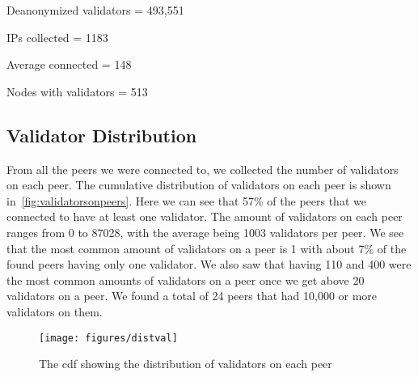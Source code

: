 Deanonymized validators = 493,551

IPs collected = 1183

Average connected = 148

Nodes with validators = 513

\subsection{Validator Distribution}\label{subsec:validator-distribution}
From all the peers we were connected to, we collected the number of validators on each peer.
The cumulative distribution of validators on each peer is shown in~\autoref{fig:validatorsonpeers}.
Here we can see that 57\% of the peers that we connected to have at least one validator.
The amount of validators on each peer ranges from 0 to 87028, with the average being 1003 validators per peer.
We see that the most common amount of validators on a peer is 1 with about 7\% of the found peers having only one validator.
We also saw that having 110 and 400 were the most common amounts of validators on a peer once we get above 20 validators on a peer.
We found a total of 24 peers that had 10,000 or more validators on them.
\begin{figure*}[!ht]
    \texttt{[image: figures/distval]}
    \caption{The cdf showing the distribution of validators on each peer}
    \label{fig:validatorsonpeers}
\end{figure*}